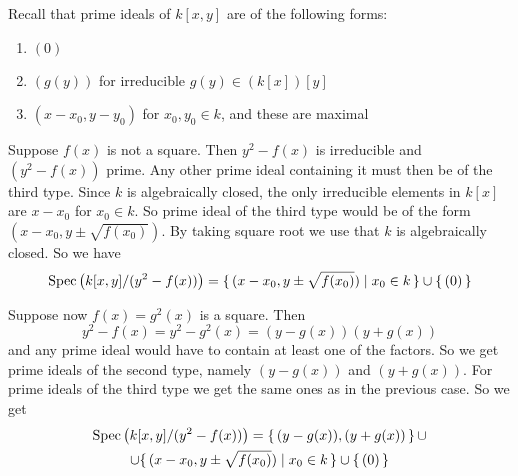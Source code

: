 \begin{exercise}{2}
    Recall that prime ideals of $k[x, y]$ are of the following forms:
    \begin{enumerate}
        \item $(0)$
        \item $(g(y))$ for irreducible $g(y) \in (k[x])[y]$
        \item $(x - x_0, y - y_0)$ for $x_0, y_0 \in k$, and these are maximal
    \end{enumerate}

    Suppose $f(x)$ is not a square. Then $y^2 - f(x)$ is irreducible and $(y^2 -
    f(x))$ prime. Any other prime ideal containing it must then be of the third
    type. Since $k$ is algebraically closed, the only irreducible elements in
    $k[x]$ are $x - x_0$ for $x_0 \in k$. So prime ideal of the third type would
    be of the form $(x - x_0, y \pm \sqrt{f(x_0)})$. By taking square root we
    use that $k$ is algebraically closed.
    So we have
    \begin{equation*}
        \operatorname{Spec}\left(k[x, y] / (y^2 - f(x))\right) = \{\, (x - x_0, y \pm
        \sqrt{f(x_0)}) \mid x_0 \in k \,\} \cup \{\,(0)\,\}
    \end{equation*}

    Suppose now $f(x) = g^2(x)$ is a square. Then
    \begin{equation*}
        y^2 - f(x) = y^2 - g^2(x) = (y - g(x)) (y + g(x))
    \end{equation*}
    and any prime ideal would have to contain at least one of the factors. So we
    get prime ideals of the second type, namely $(y - g(x))$ and $(y + g(x))$.
    For prime ideals of the third type we get the same ones as in the previous
    case. So we get
    \begin{multline*}
        \operatorname{Spec}\left(k[x, y] / (y^2 - f(x))\right) = \{\, (y - g(x)), (y + g(x))
        \,\}\,\cup \\ \cup \{\, (x - x_0, y \pm \sqrt{f(x_0)}) \mid x_0 \in k \,\} \cup
        \{\,(0)\,\}
    \end{multline*}

\end{exercise}


